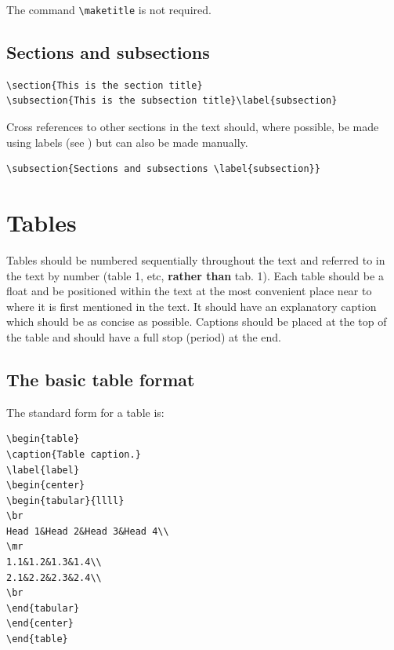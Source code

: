 \documentclass[a4paper]{jpconf}
\begin{document}
The command \verb"\maketitle" is not
required.

\subsection{Sections and subsections}\label{subsection}

\begin{verbatim}
\section{This is the section title}
\subsection{This is the subsection title}\label{subsection}
\end{verbatim}

Cross references to other sections in the text should, where possible, 
be made using 
labels (see ) 
but can also be made manually.

\begin{verbatim}
\subsection{Sections and subsections \label{subsection}}
\end{verbatim}

\section{Tables}

Tables should be numbered sequentially throughout the text and referred to in the text 
by number (table 1, etc, {\bf rather than} tab. 1). 
Each table should be a float and be positioned within the text at the most convenient place 
near to where it is first mentioned in the text. It should have an 
explanatory caption which should be as concise as possible. 
Captions should be placed at the top of the table and should have a full stop (period) at the end. 

\subsection{The basic table format}
The standard form for a table is:
\begin{verbatim}
\begin{table}
\caption{Table caption.}
\label{label}
\begin{center}
\begin{tabular}{llll}
\br
Head 1&Head 2&Head 3&Head 4\\
\mr
1.1&1.2&1.3&1.4\\
2.1&2.2&2.3&2.4\\
\br
\end{tabular}
\end{center}
\end{table}
\end{verbatim}
\end{document}
